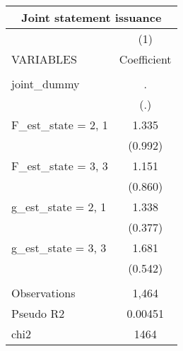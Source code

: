 \documentclass[]{article}
\begin{document}
\begin{tabular}{lc}
\multicolumn{2}{c}{Joint statement issuance} \\ \hline
 & (1) \\
VARIABLES & Coefficient \\ \hline
 &  \\
joint\_dummy & . \\
 & (.) \\
F\_est\_state = 2, 1 & 1.335 \\
 & (0.992) \\
F\_est\_state = 3, 3 & 1.151 \\
 & (0.860) \\
g\_est\_state = 2, 1 & 1.338 \\
 & (0.377) \\
g\_est\_state = 3, 3 & 1.681 \\
 & (0.542) \\
 &  \\
Observations & 1,464 \\
Pseudo R2 & 0.00451 \\
 chi2 & 1464 \\ \hline
\end{tabular}
\end{document}
